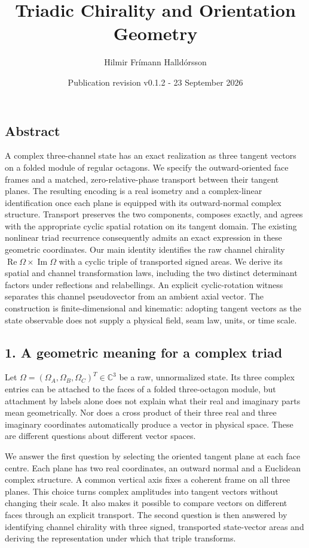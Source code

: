 \documentclass[
  11pt,
  a4paper,
]{article}
\title{Triadic Chirality and Orientation Geometry}
\author{Hilmir Frímann Halldórsson}
\date{Publication revision v0.1.2 - 23 September 2026}
\begin{document}
\maketitle

\subsection{Abstract}\label{abstract}

A complex three-channel state has an exact realization as three tangent vectors on a folded module of regular octagons. We specify the outward-oriented face frames and a matched, zero-relative-phase transport between their tangent planes. The resulting encoding is a real isometry and a complex-linear identification once each plane is equipped with its outward-normal complex structure. Transport preserves the two components, composes exactly, and agrees with the appropriate cyclic spatial rotation on its tangent domain. The existing nonlinear triad recurrence consequently admits an exact expression in these geometric coordinates. Our main identity identifies the raw channel chirality \(\operatorname{Re}\Omega\times\operatorname{Im}\Omega\) with a cyclic triple of transported signed areas. We derive its spatial and channel transformation laws, including the two distinct determinant factors under reflections and relabellings. An explicit cyclic-rotation witness separates this channel pseudovector from an ambient axial vector. The construction is finite-dimensional and kinematic: adopting tangent vectors as the state observable does not supply a physical field, seam law, units, or time scale.

\subsection{1. A geometric meaning for a complex triad}\label{a-geometric-meaning-for-a-complex-triad}

Let \(\Omega=(\Omega_A,\Omega_B,\Omega_C)^T\in\mathbb C^3\) be a raw, unnormalized state. Its three complex entries can be attached to the faces of a folded three-octagon module, but attachment by labels alone does not explain what their real and imaginary parts mean geometrically. Nor does a cross product of their three real and three imaginary coordinates automatically produce a vector in physical space. These are different questions about different vector spaces.

We answer the first question by selecting the oriented tangent plane at each face centre. Each plane has two real coordinates, an outward normal and a Euclidean complex structure. A common vertical axis fixes a coherent frame on all three planes. This choice turns complex amplitudes into tangent vectors without changing their scale. It also makes it possible to compare vectors on different faces through an explicit transport. The second question is then answered by identifying channel chirality with three signed, transported state-vector areas and deriving the representation under which that triple transforms.
\end{document}
